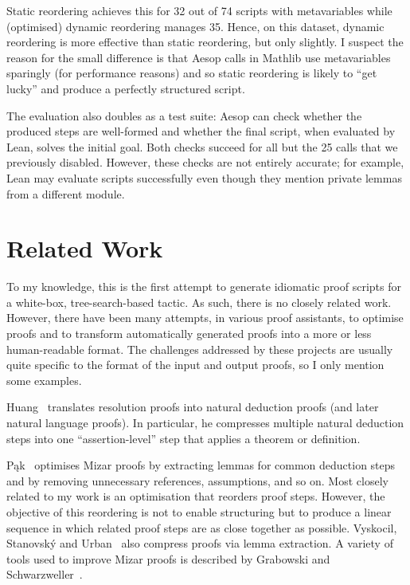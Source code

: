 \documentclass[sigplan,10pt,anonymous,review]{acmart}
\begin{document}
Static reordering achieves this for 32 out of 74 scripts with metavariables while (optimised) dynamic reordering manages 35.
Hence, on this dataset, dynamic reordering is more effective than static reordering, but only slightly.
I suspect the reason for the small difference is that Aesop calls in Mathlib use metavariables sparingly (for performance reasons) and so static reordering is likely to \enquote{get lucky} and produce a perfectly structured script.

\medskip

The evaluation also doubles as a test suite: Aesop can check whether the produced steps are well-formed and whether the final script, when evaluated by Lean, solves the initial goal.
Both checks succeed for all but the 25 calls that we previously disabled.
However, these checks are not entirely accurate; for example, Lean may evaluate scripts successfully even though they mention private lemmas from a different module.

\section{Related Work}%
\label{sec:related}

To my knowledge, this is the first attempt to generate idiomatic proof scripts for a white-box, tree-search-based tactic.
As such, there is no closely related work.
However, there have been many attempts, in various proof assistants, to optimise proofs and to transform automatically generated proofs into a more or less human-readable format.
The challenges addressed by these projects are usually quite specific to the format of the input and output proofs, so I only mention some examples.

Huang~\cite{Huang1989,Huang1994,Huang1996} translates resolution proofs into natural deduction proofs (and later natural language proofs).
In particular, he compresses multiple natural deduction steps into one \enquote{assertion-level} step that applies a theorem or definition.

Pąk~\cite{Pak2015,Pak2014a,Pak2014b,Pak2013,Pak2010} optimises Mizar proofs by extracting lemmas for common deduction steps and by removing unnecessary references, assumptions, and so on.
Most closely related to my work is an optimisation that reorders proof steps.
However, the objective of this reordering is not to enable structuring but to produce a linear sequence in which related proof steps are as close together as possible.
Vyskocil, Stanovský and Urban~\cite{Vyskovil2010} also compress proofs via lemma extraction.
A variety of tools used to improve Mizar proofs is described by Grabowski and Schwarzweller~\cite{Grabowski2009}.
\end{document}
